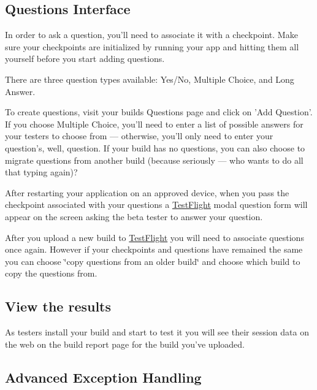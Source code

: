 \subsection*{Questions Interface}

In order to ask a question, you'll need to associate it with a checkpoint. Make sure your checkpoints are initialized by running your app and hitting them all yourself before you start adding questions.

There are three question types available\-: Yes/\-No, Multiple Choice, and Long Answer.

To create questions, visit your builds Questions page and click on 'Add Question'. If you choose Multiple Choice, you'll need to enter a list of possible answers for your testers to choose from — otherwise, you'll only need to enter your question's, well, question. If your build has no questions, you can also choose to migrate questions from another build (because seriously — who wants to do all that typing again)?

After restarting your application on an approved device, when you pass the checkpoint associated with your questions a \hyperlink{interface_test_flight}{Test\-Flight} modal question form will appear on the screen asking the beta tester to answer your question.

After you upload a new build to \hyperlink{interface_test_flight}{Test\-Flight} you will need to associate questions once again. However if your checkpoints and questions have remained the same you can choose \char`\"{}copy questions from an older build\char`\"{} and choose which build to copy the questions from.

\subsection*{View the results}

As testers install your build and start to test it you will see their session data on the web on the build report page for the build you've uploaded.

\subsection*{Advanced Exception Handling}

